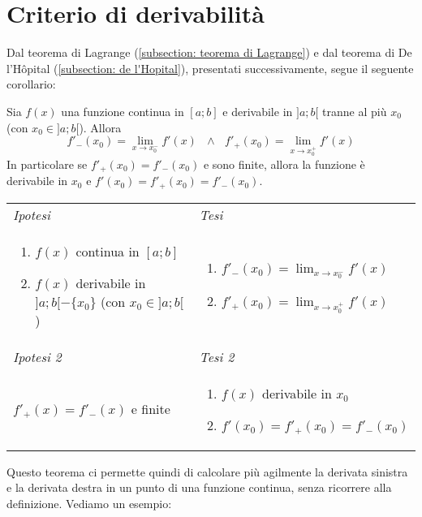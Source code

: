 \section{Criterio di derivabilità}
Dal teorema di Lagrange (\ref{subsection: teorema di Lagrange}) e dal teorema di De l'Hôpital (\ref{subsection: de l'Hopital}), presentati successivamente, segue il seguente corollario:
\begin{shaded}
    \begin{corollary*}
        Sia $f(x)$ una funzione continua in $[a;b]$ e derivabile in $]a;b[$ tranne al più $x_0$ (con $x_0\in ]a;b[$). Allora 
        \[f'_-(x_0)=\lim_{x\to x_0^-}f'(x) ~~~\land~~~ f'_+(x_0)=\lim_{x\to x_0^+}f'(x)\]
        In particolare se $f'_+(x_0) = f'_-(x_0)$ e sono finite, allora la funzione è derivabile in $x_0$ e $f'(x_0)=f'_+(x_0) = f'_-(x_0)$. 
    \end{corollary*}
\end{shaded}
\begin{tabular}{m{}m{}}
    \textit{Ipotesi} & \textit{Tesi}  \\
    \begin{enumerate}
        \item $f(x)$ continua in $[a;b]$
        \item $f(x)$ derivabile in $]a;b[-\{x_0\}$ (con $x_0\in]a;b[$)
    \end{enumerate} & \begin{enumerate}
        \item $f'_-(x_0)=\lim_{x\to x_0^-}f'(x)$
        \item $f'_+(x_0)=\lim_{x\to x_0^+}f'(x)$
    \end{enumerate}\\
    \textit{Ipotesi 2} & \textit{Tesi 2}  \\
    $f'_+(x) = f'_-(x)$ e finite & \begin{enumerate}
        \item $f(x)$ derivabile in $x_0$
        \item $f'(x_0)=f'_+(x_0) = f'_-(x_0)$
    \end{enumerate}
\end{tabular}
Questo teorema ci permette quindi di calcolare più agilmente la derivata sinistra e la derivata destra in un punto di una funzione continua, senza ricorrere alla definizione. Vediamo un esempio:

